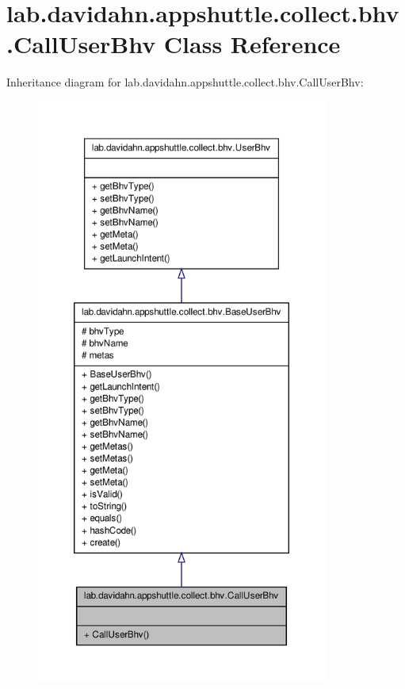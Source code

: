 \hypertarget{classlab_1_1davidahn_1_1appshuttle_1_1collect_1_1bhv_1_1_call_user_bhv}{\section{lab.\-davidahn.\-appshuttle.\-collect.\-bhv.\-Call\-User\-Bhv \-Class \-Reference}
\label{classlab_1_1davidahn_1_1appshuttle_1_1collect_1_1bhv_1_1_call_user_bhv}
}


\-Inheritance diagram for lab.\-davidahn.\-appshuttle.\-collect.\-bhv.\-Call\-User\-Bhv\-:
\nopagebreak
\begin{figure}[H]
\begin{center}
\leavevmode
\includegraphics[height=550pt]{classlab_1_1davidahn_1_1appshuttle_1_1collect_1_1bhv_1_1_call_user_bhv__inherit__graph}
\end{center}
\end{figure}


